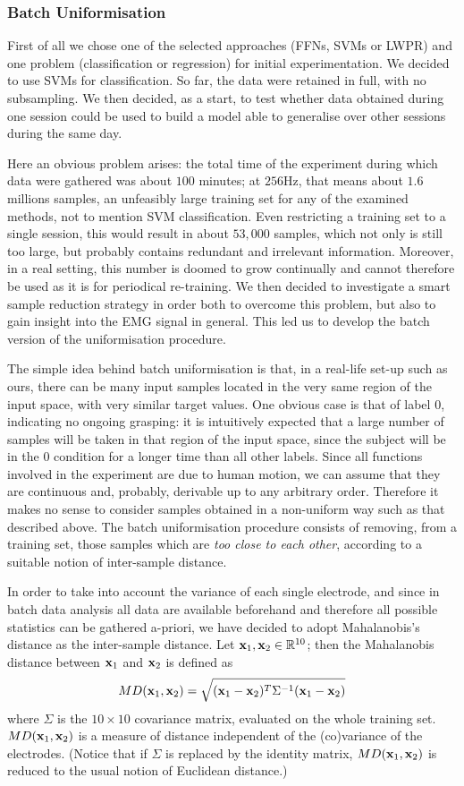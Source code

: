 \subsubsection{Batch Uniformisation}

First of all we chose one of the selected approaches (FFNs, SVMs or
LWPR) and one problem (classification or regression) for initial
experimentation. We decided to use SVMs for classification. So far,
the data were retained in full, with no subsampling. We then decided,
as a start, to test whether data obtained during one session could be
used to build a model able to generalise over other sessions during
the same day.

Here an obvious problem arises: the total time of the experiment
during which data were gathered was about $100$ minutes; at $256$Hz,
that means about $1.6$ millions samples, an unfeasibly large training
set for any of the examined methods, not to mention SVM
classification. Even restricting a training set to a single session,
this would result in about $53,000$ samples, which not only is still
too large, but probably contains redundant and irrelevant information.
Moreover, in a real setting, this number is doomed to grow continually
and cannot therefore be used as it is for periodical re-training. We
then decided to investigate a smart sample reduction strategy in order
both to overcome this problem, but also to gain insight into the EMG
signal in general. This led us to develop the batch version of the
uniformisation procedure.

The simple idea behind batch uniformisation is that, in a real-life
set-up such as ours, there can be many input samples located in the
very same region of the input space, with very similar target
values. One obvious case is that of label $0$, indicating no ongoing
grasping: it is intuitively expected that a large number of samples
will be taken in that region of the input space, since the subject
will be in the $0$ condition for a longer time than all other
labels. Since all functions involved in the experiment are due to
human motion, we can assume that they are continuous and, probably,
derivable up to any arbitrary order. Therefore it makes no sense to
consider samples obtained in a non-uniform way such as that described
above. The batch uniformisation procedure consists of removing, from a
training set, those samples which are \emph{too close to each other},
according to a suitable notion of inter-sample distance.

In order to take into account the variance of each single electrode,
and since in batch data analysis all data are available beforehand and
therefore all possible statistics can be gathered a-priori, we have
decided to adopt Mahalanobis's distance as the inter-sample
distance. Let $\mathbf{x}_1, \mathbf{x}_2 \in \mathbb{R}^{10}$; then the Mahalanobis
distance between $\mathbf{x}_1$ and $\mathbf{x}_2$ is defined as
$$
  MD(\mathbf{x}_1,\mathbf{x}_2) = \sqrt{(\mathbf{x}_1-\mathbf{x}_2)^T \Sigma^{-1} (\mathbf{x}_1-\mathbf{x}_2)}
$$
where $\Sigma$ is the $10\times10$ covariance matrix, evaluated
on the whole training set. $MD(\mathbf{x}_1,\mathbf{x}_2)$ is a measure of distance
independent of the (co)variance of the electrodes. (Notice that if
$\Sigma$ is replaced by the identity matrix, $MD(\mathbf{x}_1,\mathbf{x}_2)$ is
reduced to the usual notion of Euclidean distance.)

